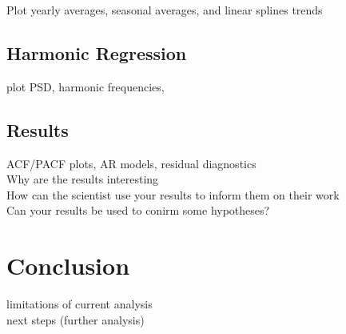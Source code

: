\documentclass[12pt]{article}
\begin{document}
Plot yearly averages, seasonal averages, and linear splines trends

\subsection{Harmonic Regression}
plot PSD, harmonic frequencies, 

\subsection{Results}
ACF/PACF plots, AR models, residual diagnostics\\
Why are the results interesting\\
How can the scientist use your results to inform them on their work\\
Can your results be used to conirm some hypotheses?\\


\section{Conclusion}
limitations of current analysis\\
next steps (further analysis)




\end{document}
